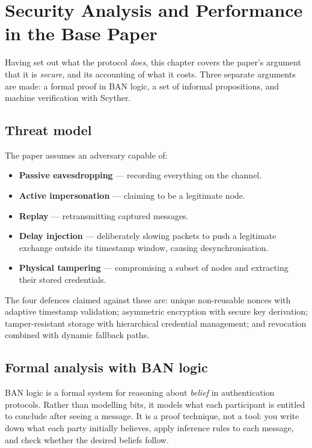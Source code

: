 \chapter{Security Analysis and Performance in the Base Paper}
\label{ch:basesec}

Having set out what the protocol \emph{does}, this chapter covers the paper's argument that
it is \emph{secure}, and its accounting of what it costs. Three separate arguments are made:
a formal proof in BAN logic, a set of informal propositions, and machine verification with
Scyther.

\section{Threat model}

The paper assumes an adversary capable of:

\begin{itemize}
\item \textbf{Passive eavesdropping} --- recording everything on the channel.
\item \textbf{Active impersonation} --- claiming to be a legitimate node.
\item \textbf{Replay} --- retransmitting captured messages.
\item \textbf{Delay injection} --- deliberately slowing packets to push a legitimate
      exchange outside its timestamp window, causing desynchronisation.
\item \textbf{Physical tampering} --- compromising a subset of nodes and extracting their
      stored credentials.
\end{itemize}

The four defences claimed against these are: unique non-reusable nonces with adaptive
timestamp validation; asymmetric encryption with secure key derivation; tamper-resistant
storage with hierarchical credential management; and revocation combined with dynamic
fallback paths.

\section{Formal analysis with BAN logic}

BAN logic \cite{ban} is a formal system for reasoning about \emph{belief} in authentication
protocols. Rather than modelling bits, it models what each participant is entitled to
conclude after seeing a message. It is a proof technique, not a tool: you write down what
each party initially believes, apply inference rules to each message, and check whether the
desired beliefs follow.

